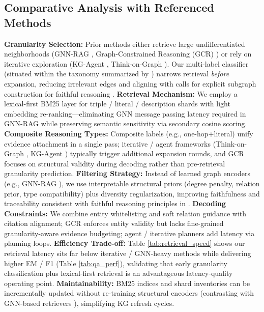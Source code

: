 \documentclass[conference]{IEEEtran}
\begin{document}
\subsection{Comparative Analysis with Referenced Methods}
\textbf{Granularity Selection:} Prior methods either retrieve large undifferentiated neighborhoods (GNN-RAG \cite{mavromatis2024gnn}, Graph-Constrained Reasoning (GCR) \cite{luo2024graph}) or rely on iterative exploration (KG-Agent \cite{jiang2024kg}, Think-on-Graph \cite{sun2023think}). Our multi-label classifier (situated within the taxonomy summarized by \cite{jin2024large}) narrows retrieval \emph{before} expansion, reducing irrelevant edges and aligning with calls for explicit subgraph construction for faithful reasoning \cite{luo2023reasoning}.
\textbf{Retrieval Mechanism:} We employ a lexical-first BM25 layer for triple / literal / description shards with light embedding re-ranking—eliminating GNN message passing latency required in GNN-RAG \cite{mavromatis2024gnn} while preserving semantic sensitivity via secondary cosine scoring.
\textbf{Composite Reasoning Types:} Composite labels (e.g., one-hop+literal) unify evidence attachment in a single pass; iterative / agent frameworks (Think-on-Graph \cite{sun2023think}, KG-Agent \cite{jiang2024kg}) typically trigger additional expansion rounds, and GCR \cite{luo2024graph} focuses on structural validity during decoding rather than pre-retrieval granularity prediction.
\textbf{Filtering Strategy:} Instead of learned graph encoders (e.g., GNN-RAG \cite{mavromatis2024gnn}), we use interpretable structural priors (degree penalty, relation prior, type compatibility) plus diversity regularization, improving faithfulness and traceability consistent with faithful reasoning principles in \cite{luo2023reasoning}.
\textbf{Decoding Constraints:} We combine entity whitelisting and soft relation guidance with citation alignment; GCR \cite{luo2024graph} enforces entity validity but lacks fine-grained granularity-aware evidence budgeting; agent / iterative planners \cite{jiang2024kg,sun2023think} add latency via planning loops.
\textbf{Efficiency Trade-off:} Table \ref{tab:retrieval_speed} shows our retrieval latency sits far below iterative / GNN-heavy methods \cite{mavromatis2024gnn,jiang2024kg,sun2023think} while delivering higher EM / F1 (Table \ref{tab:qa_perf}), validating that early granularity classification plus lexical-first retrieval is an advantageous latency-quality operating point.
\textbf{Maintainability:} BM25 indices and shard inventories can be incrementally updated without re-training structural encoders (contrasting with GNN-based retrievers \cite{mavromatis2024gnn}), simplifying KG refresh cycles.
\end{document}
